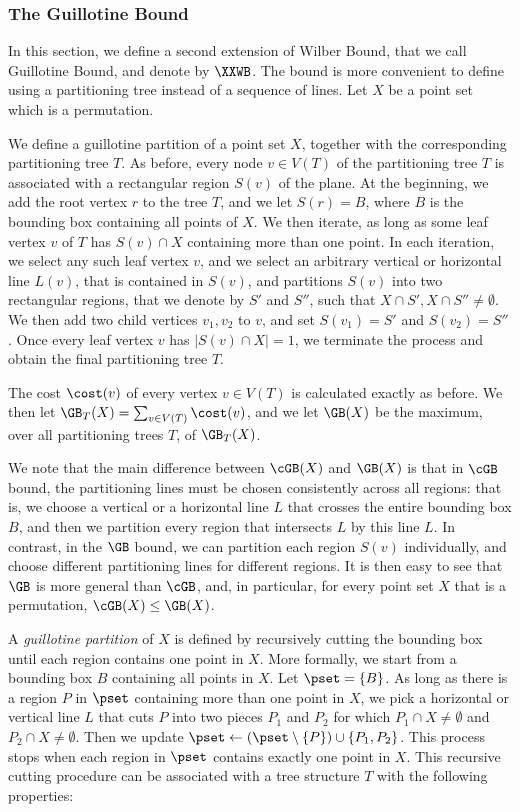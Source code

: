 \documentclass[11pt]{article}
\numberwithin{equation}{section}
\theoremstyle{definition}
\theoremstyle{plain}
\begin{document}
\subsubsection{The Guillotine Bound}

In this section, we define a second extension of Wilber Bound, that we call Guillotine Bound, and denote by $\XXWB$. The bound is more convenient to define using a partitioning tree instead of a sequence of lines. 
Let $X$ be a point set which is a permutation.  

We define a guillotine partition of a point set $X$, together with the corresponding partitioning tree $T$. 
As before, every node $v\in V(T)$ of the partitioning tree $T$ is associated with a rectangular region $S(v)$ of the plane. At the beginning, we add the root vertex $r$ to the tree $T$, and we let $S(r)=B$, where $B$ is the bounding box containing all points of $X$. We then iterate, as long as some leaf vertex $v$ of $T$ has $S(v)\cap X$ containing more than one point. In each iteration, we select any such leaf vertex $v$, and we select an arbitrary vertical or horizontal line $L(v)$, that is contained in $S(v)$, and partitions $S(v)$ into two rectangular regions, that we denote by $S'$ and $S''$, such that $X\cap S',X\cap S''\neq \emptyset$. We then add two child vertices $v_1,v_2$ to $v$, and set $S(v_1)=S'$ and $S(v_2)=S''$. Once every leaf vertex $v$ has $|S(v)\cap X|=1$, we terminate the process and obtain the final partitioning tree $T$.

The cost $\cost(v)$ of every vertex $v\in V(T)$ is calculated exactly as before. We then let $\GB_T(X)=\sum_{v\in V(T)}\cost(v)$, and we let $\GB(X)$ be the maximum, over all partitioning trees $T$, of $\GB_T(X)$. 

We note that the main difference between $\cGB(X)$ and $\GB(X)$ is that in $\cGB$ bound, the partitioning lines must be chosen consistently across all regions: that is, we choose a vertical or a horizontal line $L$ that crosses the entire bounding box $B$, and then we partition every region that intersects $L$ by this line $L$. In contrast, in the $\GB$ bound, we can partition each region $S(v)$ individually, and choose different partitioning lines for different regions. It is then easy to see that $\GB$ is more general than $\cGB$, and, in particular, for every point set $X$ that is a permutation, $\cGB(X)\leq \GB(X)$.

\iffalse

A \emph{guillotine partition} of $X$ is defined by recursively cutting the bounding box until each region contains one point in $X$. 
More formally, we start from a bounding box $B$ containing all points in $X$. 
Let $\pset = \{B\}$. 
As long as there is a region $P$ in $\pset$ containing more than one point in $X$, we pick a horizontal or vertical line $L$ that cuts $P$ into two pieces $P_1$ and $P_2$ for which $P_1 \cap X \neq \emptyset$ and $P_2 \cap X \neq \emptyset$.
Then we update $\pset \leftarrow (\pset \setminus \{P\}) \cup \{P_1, P_2 \}$.   
This process stops when each region in $\pset$ contains exactly one point in $X$. 
This recursive cutting procedure can be associated with a tree structure $T$ with the following properties: 
\end{document}
